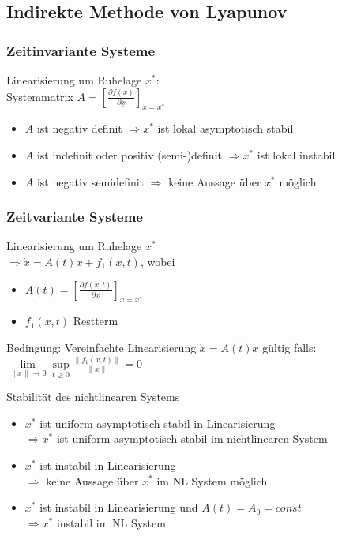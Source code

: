 \documentclass[german]{latex4ei/latex4ei_sheet}
\begin{document}
\begin{sectionbox}
\subsection{Indirekte Methode von Lyapunov}
\subsubsection{Zeitinvariante Systeme}
Linearisierung um Ruhelage $x^*$:\\
Systemmatrix $A = \left[ \frac{\partial \underline{f}(\underline{x})}{\partial \underline{x}} \right]_{x=x^*}$
\begin{itemize}
  \item $A$ ist negativ definit $\Rightarrow x^*$ ist lokal asymptotisch stabil
  \item $A$ ist indefinit oder positiv (semi-)definit $\Rightarrow x^*$ ist lokal instabil
  \item $A$ ist negativ semidefinit $\Rightarrow$ keine Aussage über $x^*$ möglich
\end{itemize}

\subsubsection{Zeitvariante Systeme}
Linearisierung um Ruhelage $x^*$ \\
$\Rightarrow \dot{x} = A(t) x + f_1(x,t)$, wobei \\
\begin{itemize}
  \item $A(t) = \left[ \frac{\partial f(x,t)}{\partial x} \right]_{x=x^*}$
  \item $f_1(x,t)$ Restterm
\end{itemize}

Bedingung: Vereinfachte Linearisierung $\dot{x}  = A(t) x$ gültig falls: \\
$\lim\limits_{\|x\| \rightarrow 0} \sup\limits_{t \geq 0} \frac{\|f_1(x,t)\|}{\|x\|} = 0$

Stabilität des nichtlinearen Systems
\begin{itemize}
  \item $x^*$ ist uniform asymptotisch stabil in Linearisierung \\
    $\Rightarrow x^*$ ist uniform asymptotisch stabil im nichtlinearen System
  \item $x^*$ ist instabil in Linearisierung \\
    $\Rightarrow$ keine Aussage über $x^*$ im NL System möglich
  \item $x^*$ ist instabil in Linearisierung und $A(t) = A_0 = const$ \\
    $\Rightarrow x^*$ instabil im NL System
\end{itemize}


\end{sectionbox}
\end{document}
